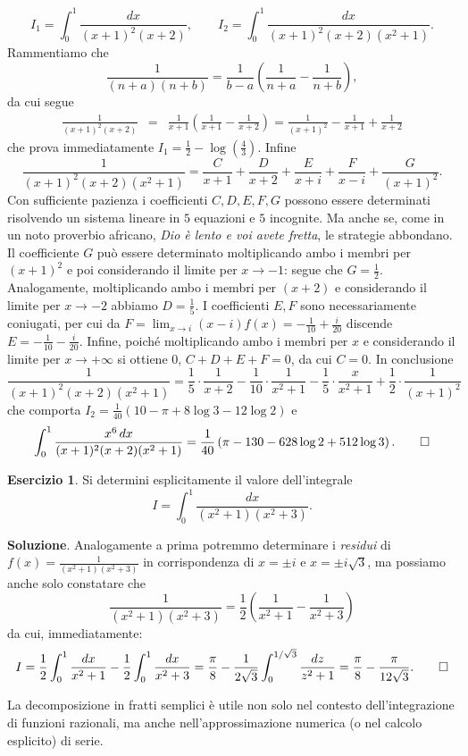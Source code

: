 \documentclass[a4paper,twoside]{article}
\theoremstyle{definition}
\newtheorem{ex}[theorem]{Esercizio}
\numberwithin{theorem}{section}
\begin{document}
$$I_1=\int_{0}^{1}\frac{dx}{(x+1)^2(x+2)},\qquad I_2=\int_{0}^{1}\frac{dx}{(x+1)^2(x+2)(x^2+1)}.$$
Rammentiamo che $$\frac{1}{(n+a)(n+b)}=\frac{1}{b-a}\left(\frac{1}{n+a}-\frac{1}{n+b}\right),$$
da cui segue 
\begin{eqnarray*} \frac{1}{(x+1)^2(x+2)}&=&\frac{1}{x+1}\left(\frac{1}{x+1}-\frac{1}{x+2}\right)=\frac{1}{(x+1)^2}-\frac{1}{x+1}+\frac{1}{x+2}\end{eqnarray*}
che prova immediatamente $I_1=\frac{1}{2}-\log\left(\frac{4}{3}\right)$. Infine 
$$ \frac{1}{(x+1)^2(x+2)(x^2+1)}=\frac{C}{x+1}+\frac{D}{x+2}+\frac{E}{x+i}+\frac{F}{x-i}+\frac{G}{(x+1)^2}.$$
Con sufficiente pazienza i coefficienti $C,D,E,F,G$ possono essere determinati risolvendo un sistema lineare in $5$ equazioni e $5$ incognite. Ma anche se, come in un noto proverbio africano, \emph{Dio è lento e voi avete fretta}, le strategie abbondano. Il coefficiente $G$ può essere determinato moltiplicando ambo i membri per $(x+1)^2$ e poi considerando il limite per $x\to -1$: segue che $G=\frac{1}{2}$. Analogamente, moltiplicando ambo i membri per $(x+2)$ e considerando il limite per $x\to -2$ abbiamo $D=\frac{1}{5}$. I coefficienti $E,F$ sono necessariamente coniugati, per cui da $F=\lim_{x\to i}(x-i)f(x)=-\frac{1}{10}+\frac{i}{20}$ discende $E=-\frac{1}{10}-\frac{i}{20}$. Infine, poiché moltiplicando ambo i membri per $x$ e considerando il limite per $x\to +\infty$ si ottiene $0$, $C+D+E+F=0$, da cui $C=0$. In conclusione 
$$ \frac{1}{(x+1)^2(x+2)(x^2+1)} = \frac{1}{5}\cdot\frac{1}{x+2}-\frac{1}{10}\cdot\frac{1}{x^2+1}-\frac{1}{5}\cdot\frac{x}{x^2+1}+\frac{1}{2}\cdot\frac{1}{(x+1)^2} $$
che comporta $I_2=\frac{1}{40}\left(10-\pi+8\log 3-12\log 2\right)$ e 
$$ \int_{0}^{1}\frac{x^6\,dx}{(x+1)^2(x+2)(x^2+1)}=\frac{1}{40}\left(\pi-130-628\log 2+512\log 3\right).\qed $$
\begin{ex} Si determini esplicitamente il valore dell'integrale 
$$ I=\int_{0}^{1}\frac{dx}{(x^2+1)(x^2+3)}. $$
\end{ex}
\textbf{Soluzione}. Analogamente a prima potremmo determinare i \emph{residui} di $f(x)=\frac{1}{(x^2+1)(x^2+3)}$ in corrispondenza di $x=\pm i$ e $x=\pm i\sqrt{3}$, ma possiamo anche solo constatare che 
$$ \frac{1}{(x^2+1)(x^2+3)} = \frac{1}{2}\left(\frac{1}{x^2+1}-\frac{1}{x^2+3}\right) $$
da cui, immediatamente:
$$ I = \frac{1}{2}\int_{0}^{1}\frac{dx}{x^2+1}-\frac{1}{2}\int_{0}^{1}\frac{dx}{x^2+3}=\frac{\pi}{8}-\frac{1}{2\sqrt{3}}\int_{0}^{1/\sqrt{3}}\frac{dz}{z^2+1} = \frac{\pi}{8}-\frac{\pi}{12\sqrt{3}}.\qed$$

La decomposizione in fratti semplici è utile non solo nel contesto dell'integrazione di funzioni razionali, ma anche nell'approssimazione numerica (o nel calcolo esplicito) di serie.
\end{document}

